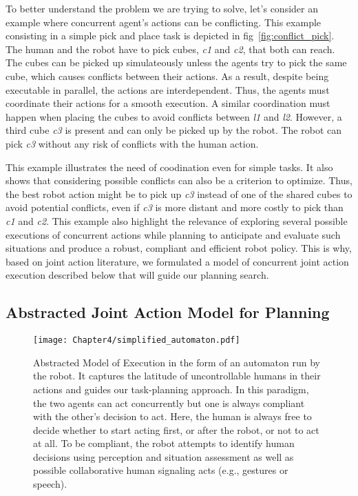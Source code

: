 To better understand the problem we are trying to solve, let's consider an example where concurrent agent's actions can be conflicting. This example consisting in a simple pick and place task is depicted in fig~\ref{fig:conflict_pick}. The human and the robot have to pick cubes, \emph{c1} and \emph{c2}, that both can reach. 
The cubes can be picked up simulateously unless the agents try to pick the same cube, which causes conflicts between their actions. As a result, despite being executable in parallel, the actions are interdependent. Thus, the agents must coordinate their actions for a smooth execution.
A similar coordination must happen when placing the cubes to avoid conflicts between \emph{l1} and \emph{l2}.
However, a third cube \emph{c3} is present and can only be picked up by the robot. The robot can pick \emph{c3} without any risk of conflicts with the human action. 

This example illustrates the need of coodination even for simple tasks. It also shows that considering possible conflicts can also be a criterion to optimize. Thus, the best robot action might be to pick up \emph{c3} instead of one of the shared cubes to avoid potential conflicts, even if \emph{c3} is more distant and more costly to pick than \emph{c1} and \emph{c2}.
This example also highlight the relevance of exploring several possible executions of concurrent actions while planning to anticipate and evaluate such situations and produce a robust, compliant and efficient robot policy. This is why, based on joint action literature, we formulated a model of concurrent joint action execution described below that will guide our planning search.

\subsection{Abstracted Joint Action Model for Planning}

\begin{figure}
    \centering
    \texttt{[image: Chapter4/simplified\_automaton.pdf]}
    \caption{
    Abstracted Model of Execution in the form of an automaton run by the robot. It captures the latitude of uncontrollable humans in their actions and guides our task-planning approach.
    In this paradigm, the two agents can act concurrently but one is always compliant with the other's decision to act.
    Here, the human is always free to decide whether to start acting first, or after the robot, or not to act at all.
    To be compliant, the robot attempts to identify human decisions using perception and situation assessment as well as possible collaborative human signaling acts (e.g., gestures or speech).
    }
    \label{fig:simplified_model_exec}
\end{figure}

